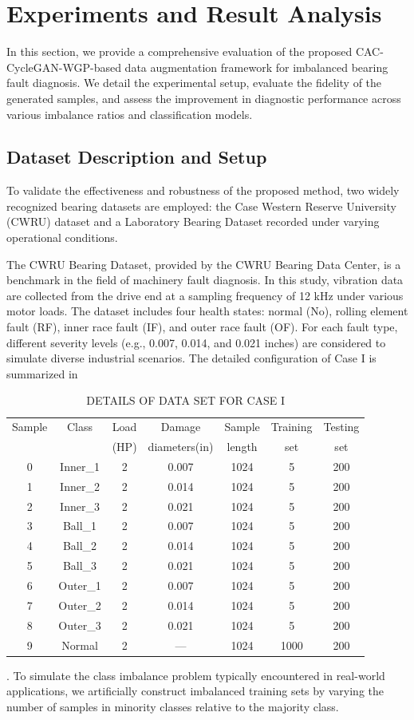 \documentclass[twocolumn]{IEEEtran}
\begin{document}
\section{Experiments and Result Analysis}
In this section, we provide a comprehensive evaluation of the proposed CAC-CycleGAN-WGP-based data augmentation framework for imbalanced bearing fault diagnosis. We detail the experimental setup, evaluate the fidelity of the generated samples, and assess the improvement in diagnostic performance across various imbalance ratios and classification models.

\subsection{Dataset Description and Setup}
To validate the effectiveness and robustness of the proposed method, two widely recognized bearing datasets are employed: the Case Western Reserve University (CWRU) dataset \cite{Smith2015} and a Laboratory Bearing Dataset recorded under varying operational conditions.

The CWRU Bearing Dataset, provided by the CWRU Bearing Data Center, is a benchmark in the field of machinery fault diagnosis. In this study, vibration data are collected from the drive end at a sampling frequency of 12 kHz under various motor loads. The dataset includes four health states: normal (No), rolling element fault (RF), inner race fault (IF), and outer race fault (OF). For each fault type, different severity levels (e.g., 0.007, 0.014, and 0.021 inches) are considered to simulate diverse industrial scenarios. The detailed configuration of Case I is summarized in \begin{table}[htbp]
\centering
\caption{DETAILS OF DATA SET FOR CASE I}
\label{tab:dataset_caseI}
\begin{tabular}{ccccccc}
\hline
Sample & Class & Load & Damage & Sample & Training & Testing \\
 & & (HP) & diameters(in) & length & set & set \\
\hline
0 & Inner\_1 & 2 & 0.007 & 1024 & 5 & 200 \\
1 & Inner\_2 & 2 & 0.014 & 1024 & 5 & 200 \\
2 & Inner\_3 & 2 & 0.021 & 1024 & 5 & 200 \\
3 & Ball\_1 & 2 & 0.007 & 1024 & 5 & 200 \\
4 & Ball\_2 & 2 & 0.014 & 1024 & 5 & 200 \\
5 & Ball\_3 & 2 & 0.021 & 1024 & 5 & 200 \\
6 & Outer\_1 & 2 & 0.007 & 1024 & 5 & 200 \\
7 & Outer\_2 & 2 & 0.014 & 1024 & 5 & 200 \\
8 & Outer\_3 & 2 & 0.021 & 1024 & 5 & 200 \\
9 & Normal & 2 & --- & 1024 & 1000 & 200 \\
\hline
\end{tabular}
\end{table}. To simulate the class imbalance problem typically encountered in real-world applications, we artificially construct imbalanced training sets by varying the number of samples in minority classes relative to the majority class.
\end{document}
